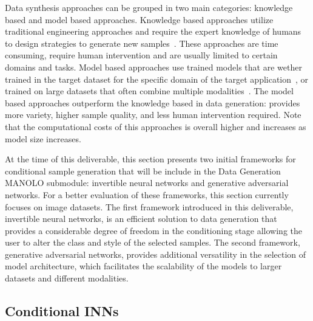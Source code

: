 Data synthesis approaches can be grouped in two main categories: knowledge based and model based approaches. Knowledge based approaches utilize traditional engineering approaches and require the expert knowledge of humans to design strategies to generate new samples~\citep{2015_NeurIPS_character, 2021_arxiv_AEDA, 2021_arxiv_data}. These approaches are time consuming, require human intervention and are usually limited to certain domains and tasks. Model based approaches use trained models that are wether trained in the target dataset for the specific domain of the target application~\citep{2014_NeurIPS_GAN, 2016_ACL_improving, 2019_arxiv_cinn}, or trained on large datasets that often combine multiple modalities~\citep{2024_WACV_Semantic, 2024_CVPR_towards, 2024_ICASP_image}. The model based approaches outperform the knowledge based in data generation: provides more variety, higher sample quality, and less human intervention required. Note that the computational costs of this approaches is overall higher and increases as model size increases.  

At the time of this deliverable, this section presents two initial frameworks for conditional sample generation that will be include in the Data Generation MANOLO submodule: invertible neural networks and generative adversarial networks. For a better evaluation of these frameworks, this section currently focuses on image datasets. The first framework introduced in this deliverable, invertible neural networks, is an efficient solution to data generation that provides a considerable degree of freedom in the conditioning stage allowing the user to alter the class and style of the selected samples. The second framework, generative adversarial networks, provides additional versatility in the selection of model architecture, which facilitates the scalability of the models to larger datasets and different modalities.

\subsection{Conditional INNs}
\label{subsec:2.3_datasynth_tech1}

